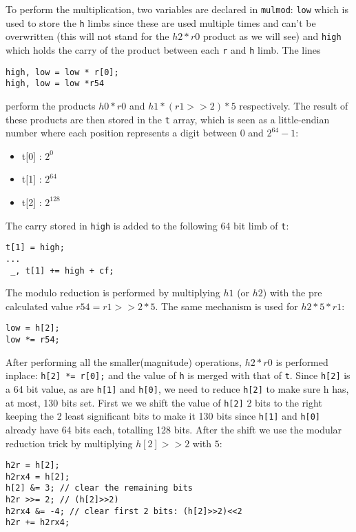 \documentclass{article}
\begin{document}
To perform the multiplication, two variables are declared in \texttt{mulmod}: \texttt{low} which is used to store the \texttt{h} limbs since these are used multiple
times and can't be overwritten (this will not stand for the $h2*r0$ product as we will see) and \texttt{high} which holds the carry of the product between 
each \texttt{r} and \texttt{h} limb. The lines 
\begin{Verbatim}[fontsize=\footnotesize]
high, low = low * r[0];
high, low = low *r54
\end{Verbatim}
perform the products $h0*r0$ and $h1*(r1>>2)*5$ respectively.
The result of these products are then stored in the \texttt{t} array, which is seen as a little-endian number where each position represents a digit between $0$ 
and $2^{64}-1$: 
\begin{itemize}
    \item t[0] : $2^{0}$
    \item t[1] : $2^{64}$
    \item t[2] : $2^{128}$
\end{itemize}

The carry stored in \texttt{high} is added to the following 64 bit limb of \texttt{t}:
\begin{Verbatim}[fontsize=\footnotesize]
t[1] = high;
...
 _, t[1] += high + cf;
\end{Verbatim}
The modulo reduction is performed by multiplying $h1$ (or $h2$) with the pre calculated value $r54=r1>>2*5$. The same mechanism is used for $h2*5*r1$:
\begin{Verbatim}[fontsize=\footnotesize]
low = h[2];
low *= r54;
\end{Verbatim}

After performing all the smaller(magnitude) operations, $h2*r0$ is performed inplace: \texttt{h[2] *= r[0];} and the value of \texttt{h} is merged with that
of \texttt{t}.
Since \texttt{h[2]} is a 64 bit value, as are \texttt{h[1]} and \texttt{h[0]}, we need to reduce \texttt{h[2]} to make sure h has, at most, 130 bits set. 
First we we shift the value of \texttt{h[2]} 2 bits to the right keeping the 2 least significant bits to make it 130 bits since \texttt{h[1]} and \texttt{h[0]}
already have 64 bits each, totalling 128 bits. After the shift we use the modular reduction trick by multiplying $h[2]>>2$ with $5$:
\begin{Verbatim}[fontsize=\footnotesize]
h2r = h[2];
h2rx4 = h[2];
h[2] &= 3; // clear the remaining bits
h2r >>= 2; // (h[2]>>2)
h2rx4 &= -4; // clear first 2 bits: (h[2]>>2)<<2
h2r += h2rx4;
\end{Verbatim}
\end{document}
